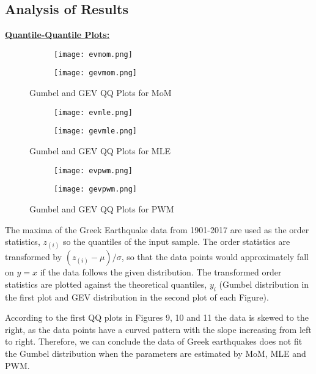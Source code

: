\documentclass{article}
\begin{document}


\subsection{Analysis of Results}
\underline{\textbf{Quantile-Quantile Plots:}}

\begin{figure}[h]
\centering
\begin{subfigure}
  \centering
  \texttt{[image: evmom.png]}
\end{subfigure}
\begin{subfigure}
  \centering
  \texttt{[image: gevmom.png]}
\end{subfigure}
  \vspace*{-5mm} 
\caption{Gumbel and GEV QQ Plots for MoM}
\centering
\begin{subfigure}
  \centering
  \texttt{[image: evmle.png]}
\end{subfigure}
\begin{subfigure}
  \centering
  \texttt{[image: gevmle.png]}
\end{subfigure}
  \vspace*{-5mm} 
\caption{Gumbel and GEV QQ Plots for MLE}
\centering
\begin{subfigure}
  \centering
  \texttt{[image: evpwm.png]}
\end{subfigure}
\begin{subfigure}
  \centering
  \texttt{[image: gevpwm.png]}
\end{subfigure}
  \vspace*{-5mm}
\caption{Gumbel and GEV QQ Plots for PWM}
\end{figure}

The maxima of the Greek Earthquake data from 1901-2017 are used as the order statistics, $z_{(i)}$ so the quantiles of the input sample. The order statistics are transformed by $(z_{(i)} - \mu)/\sigma$, so that the data points would approximately fall on $y=x$ if the data follows the given distribution. The transformed order statistics are plotted against the theoretical quantiles, $y_i$ (Gumbel distribution in the first plot and GEV distribution in the second plot of each Figure).

According to the first QQ plots in Figures 9, 10 and 11 the data is skewed to the right, as the data points have a curved pattern with the slope increasing from left to right. Therefore, we can conclude the data of Greek earthquakes does not fit the Gumbel distribution when the parameters are estimated by MoM, MLE and PWM. 
\end{document}
